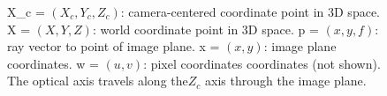 \begin{figure}
\begin{subfigure}[t]{0.475\textwidth}
      \label{fig:OPT_digram}
    \end{subfigure}
    \caption[Coordinates and \gls{OPT}]{\gls{X_c} = \((X_c,Y_c,Z_c)\): camera-centered coordinate point in \gls{3D} space.
            \gls{X} = \((X,Y,Z)\): world coordinate point in \gls{3D} space.
            \gls{p} = \((x,y,f)\): ray vector to point of \gls{image plane}.
            \gls{x} = \((x,y)\): \gls{image plane} coordinates.
            \gls{w} = \((u,v)\): pixel coordinates coordinates (not shown).
            The optical axis travels along the\(Z_c\) axis through the \gls{image plane}.}
\end{figure}


